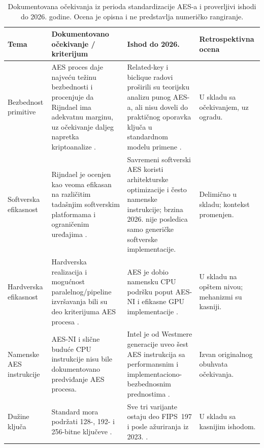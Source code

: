 \begin{table}[htbp]
\centering
\small
\setlength{\tabcolsep}{4pt}
\caption{Dokumentovana očekivanja iz perioda standardizacije AES-a i
proverljivi ishodi do 2026. godine. Ocena je opisna i ne predstavlja
numeričko rangiranje.}
\label{tab:retrospektiva}
\begin{tabular}{@{}>{\raggedright\arraybackslash}p{} >{\raggedright\arraybackslash}p{} >{\raggedright\arraybackslash}p{} >{\raggedright\arraybackslash}p{}@{}}
\toprule
Tema &
Dokumentovano očekivanje / kriterijum &
Ishod do 2026. &
Retrospektivna ocena \\
\midrule
Bezbednost primitive &
AES proces daje najveću težinu bezbednosti i procenjuje da Rijndael ima
adekvatnu marginu, uz očekivanje daljeg napretka kriptoanalize
\cite{nechvatal2001aes}. &
Related-key i biclique radovi proširili su teorijsku analizu punog AES-a,
ali nisu doveli do praktičnog oporavka ključa u standardnom modelu primene
\cite{biryukov2009aes256,bogdanov2011biclique,nist_ir8319}. &
U skladu sa očekivanjem, uz ogradu. \\

\addlinespace
Softverska efikasnost &
Rijndael je ocenjen kao veoma efikasan na različitim tadašnjim
softverskim platformama i ograničenim uređajima
\cite{nechvatal2001aes}. &
Savremeni softverski AES koristi arhitekturske optimizacije i često
namenske instrukcije; brzina 2026. nije posledica samo generičke
softverske implementacije. &
Delimično u skladu; kontekst promenjen. \\

\addlinespace
Hardverska efikasnost &
Hardverska realizacija i mogućnost paralelnog/pipeline izvršavanja bili
su deo kriterijuma AES procesa \cite{nechvatal2001aes}. &
AES je dobio namensku CPU podršku poput AES-NI i efikasne GPU
implementacije \cite{gueron2012aesni,tezcan2021gpu}. &
U skladu na opštem nivou; mehanizmi su kasniji. \\

\addlinespace
Namenske AES instrukcije &
AES-NI i slične buduće CPU instrukcije nisu bile dokumentovano
predviđanje AES procesa. &
Intel je od Westmere generacije uveo šest AES instrukcija sa
performansnim i implementaciono-bezbednosnim prednostima
\cite{gueron2012aesni}. &
Izvan originalnog obuhvata očekivanja. \\

\addlinespace
Dužine ključa &
Standard mora podržati 128-, 192- i 256-bitne ključeve
\cite{nechvatal2001aes,nist_fips197_2001}. &
Sve tri varijante ostaju deo FIPS~197 i posle ažuriranja iz 2023.
\cite{nist_fips197_2023}. &
U skladu sa kasnijim ishodom. \\


\end{tabular}
\end{table}

